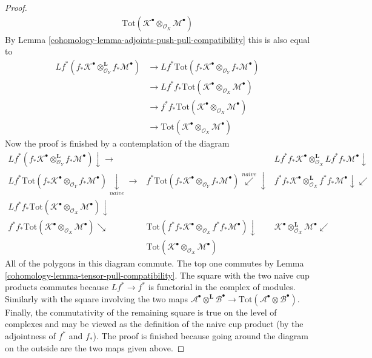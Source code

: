 \begin{proof}
\begin{align*}
\text{Tot}(\mathcal{K}^\bullet
\otimes_{\mathcal{O}_X}
\mathcal{M}^\bullet)
\end{align*}
By Lemma \ref{cohomology-lemma-adjoints-push-pull-compatibility} this is also equal to
\begin{align*}
Lf^*(f_*\mathcal{K}^\bullet
\otimes_{\mathcal{O}_Y}^\mathbf{L}
f_*\mathcal{M}^\bullet)
& \to
Lf^*\text{Tot}(
f_*\mathcal{K}^\bullet
\otimes_{\mathcal{O}_Y}
f_*\mathcal{M}^\bullet) \\
& \to
Lf^*f_*\text{Tot}(\mathcal{K}^\bullet
\otimes_{\mathcal{O}_X}
\mathcal{M}^\bullet) \\
& \to
f^*f_*\text{Tot}(\mathcal{K}^\bullet
\otimes_{\mathcal{O}_X}
\mathcal{M}^\bullet) \\
& \to
\text{Tot}(\mathcal{K}^\bullet
\otimes_{\mathcal{O}_X}
\mathcal{M}^\bullet)
\end{align*}
Now the proof is finished by a contemplation of the diagram
$$
\begin{array}{ccc}Lf^*(f_*\mathcal{K}^\bullet
\otimes_{\mathcal{O}_Y}^\mathbf{L}
f_*\mathcal{M}^\bullet) \downarrow\longrightarrow &  & Lf^*f_*\mathcal{K}^\bullet \otimes_{\mathcal{O}_X}^\mathbf{L}
Lf^*f_*\mathcal{M}^\bullet \downarrow \\ Lf^*\text{Tot}(
f_*\mathcal{K}^\bullet
\otimes_{\mathcal{O}_Y}
f_*\mathcal{M}^\bullet) \underset{naive}{\downarrow}\longrightarrow & f^*\text{Tot}(
f_*\mathcal{K}^\bullet
\otimes_{\mathcal{O}_Y}
f_*\mathcal{M}^\bullet) \overset{naive}{\swarrow}\downarrow & f^*f_*\mathcal{K}^\bullet \otimes_{\mathcal{O}_X}^\mathbf{L}
f^*f_*\mathcal{M}^\bullet \downarrow\swarrow \\ Lf^*f_*\text{Tot}(\mathcal{K}^\bullet
\otimes_{\mathcal{O}_X}
\mathcal{M}^\bullet) \downarrow &  &  \\ f^*f_*\text{Tot}(\mathcal{K}^\bullet \otimes_{\mathcal{O}_X}
\mathcal{M}^\bullet) \searrow & \text{Tot}(f^*f_*\mathcal{K}^\bullet \otimes_{\mathcal{O}_X}
f^*f_*\mathcal{M}^\bullet) \downarrow & \mathcal{K}^\bullet \otimes_{\mathcal{O}_X}^\mathbf{L}
\mathcal{M}^\bullet \swarrow \\  & \text{Tot}(\mathcal{K}^\bullet
\otimes_{\mathcal{O}_X}
\mathcal{M}^\bullet) & \end{array}
$$
All of the polygons in this diagram commute. The top one commutes
by Lemma \ref{cohomology-lemma-tensor-pull-compatibility}.
The square with the two naive cup products commutes because
$Lf^* \to f^*$ is functorial in the complex of modules.
Similarly with the square involving the two maps
$\mathcal{A}^\bullet \otimes^\mathbf{L} \mathcal{B}^\bullet \to
\text{Tot}(\mathcal{A}^\bullet \otimes \mathcal{B}^\bullet)$.
Finally, the commutativity of the remaining square
is true on the level of complexes and may be viewed as the
definition of the naive cup product (by the adjointness
of $f^*$ and $f_*$). The proof is finished because
going around the diagram on the outside are the two maps
given above.
\end{proof}

